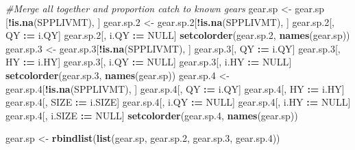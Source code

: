 \documentclass[]{article}
\newenvironment{Shaded}{\begin{snugshade}}{\end{snugshade}}
\newcommand{\KeywordTok}[1]{\textcolor[rgb]{0.13,0.29,0.53}{\textbf{#1}}}
\newcommand{\DecValTok}[1]{\textcolor[rgb]{0.00,0.00,0.81}{#1}}
\newcommand{\StringTok}[1]{\textcolor[rgb]{0.31,0.60,0.02}{#1}}
\newcommand{\CommentTok}[1]{\textcolor[rgb]{0.56,0.35,0.01}{\textit{#1}}}
\newcommand{\OtherTok}[1]{\textcolor[rgb]{0.56,0.35,0.01}{#1}}
\newcommand{\OperatorTok}[1]{\textcolor[rgb]{0.81,0.36,0.00}{\textbf{#1}}}
\newcommand{\ErrorTok}[1]{\textcolor[rgb]{0.64,0.00,0.00}{\textbf{#1}}}
\newcommand{\NormalTok}[1]{#1}
\begin{document}
\begin{Shaded}
\begin{Highlighting}[]
  \CommentTok{#Merge all together and proportion catch to known gears}
\NormalTok{  gear.sp   <-}\StringTok{ }\NormalTok{gear.sp  [}\OperatorTok{!}\KeywordTok{is.na}\NormalTok{(SPPLIVMT), ]}
\NormalTok{  gear.sp.}\DecValTok{2}\NormalTok{ <-}\StringTok{ }\NormalTok{gear.sp.}\DecValTok{2}\NormalTok{[}\OperatorTok{!}\KeywordTok{is.na}\NormalTok{(SPPLIVMT), ]}
\NormalTok{  gear.sp.}\DecValTok{2}\NormalTok{[, QY   }\OperatorTok{:}\ErrorTok{=}\StringTok{ }\NormalTok{i.QY]}
\NormalTok{  gear.sp.}\DecValTok{2}\NormalTok{[, i.QY }\OperatorTok{:}\ErrorTok{=}\StringTok{ }\OtherTok{NULL}\NormalTok{]}
  \KeywordTok{setcolorder}\NormalTok{(gear.sp.}\DecValTok{2}\NormalTok{, }\KeywordTok{names}\NormalTok{(gear.sp))}
\NormalTok{  gear.sp.}\DecValTok{3}\NormalTok{ <-}\StringTok{ }\NormalTok{gear.sp.}\DecValTok{3}\NormalTok{[}\OperatorTok{!}\KeywordTok{is.na}\NormalTok{(SPPLIVMT), ]}
\NormalTok{  gear.sp.}\DecValTok{3}\NormalTok{[, QY     }\OperatorTok{:}\ErrorTok{=}\StringTok{ }\NormalTok{i.QY]}
\NormalTok{  gear.sp.}\DecValTok{3}\NormalTok{[, HY     }\OperatorTok{:}\ErrorTok{=}\StringTok{ }\NormalTok{i.HY]}
\NormalTok{  gear.sp.}\DecValTok{3}\NormalTok{[, i.QY }\OperatorTok{:}\ErrorTok{=}\StringTok{ }\OtherTok{NULL}\NormalTok{]}
\NormalTok{  gear.sp.}\DecValTok{3}\NormalTok{[, i.HY }\OperatorTok{:}\ErrorTok{=}\StringTok{ }\OtherTok{NULL}\NormalTok{]}
  \KeywordTok{setcolorder}\NormalTok{(gear.sp.}\DecValTok{3}\NormalTok{, }\KeywordTok{names}\NormalTok{(gear.sp))}
\NormalTok{  gear.sp.}\DecValTok{4}\NormalTok{ <-}\StringTok{ }\NormalTok{gear.sp.}\DecValTok{4}\NormalTok{[}\OperatorTok{!}\KeywordTok{is.na}\NormalTok{(SPPLIVMT), ]}
\NormalTok{  gear.sp.}\DecValTok{4}\NormalTok{[, QY     }\OperatorTok{:}\ErrorTok{=}\StringTok{ }\NormalTok{i.QY]}
\NormalTok{  gear.sp.}\DecValTok{4}\NormalTok{[, HY     }\OperatorTok{:}\ErrorTok{=}\StringTok{ }\NormalTok{i.HY]}
\NormalTok{  gear.sp.}\DecValTok{4}\NormalTok{[, SIZE   }\OperatorTok{:}\ErrorTok{=}\StringTok{ }\NormalTok{i.SIZE]}
\NormalTok{  gear.sp.}\DecValTok{4}\NormalTok{[, i.QY   }\OperatorTok{:}\ErrorTok{=}\StringTok{ }\OtherTok{NULL}\NormalTok{]}
\NormalTok{  gear.sp.}\DecValTok{4}\NormalTok{[, i.HY   }\OperatorTok{:}\ErrorTok{=}\StringTok{ }\OtherTok{NULL}\NormalTok{]}
\NormalTok{  gear.sp.}\DecValTok{4}\NormalTok{[, i.SIZE }\OperatorTok{:}\ErrorTok{=}\StringTok{ }\OtherTok{NULL}\NormalTok{]}
  \KeywordTok{setcolorder}\NormalTok{(gear.sp.}\DecValTok{4}\NormalTok{, }\KeywordTok{names}\NormalTok{(gear.sp))}
  
\NormalTok{  gear.sp <-}\StringTok{ }\KeywordTok{rbindlist}\NormalTok{(}\KeywordTok{list}\NormalTok{(gear.sp, gear.sp.}\DecValTok{2}\NormalTok{, gear.sp.}\DecValTok{3}\NormalTok{, gear.sp.}\DecValTok{4}\NormalTok{))}
  

\end{Highlighting}
\end{Shaded}
\end{document}
